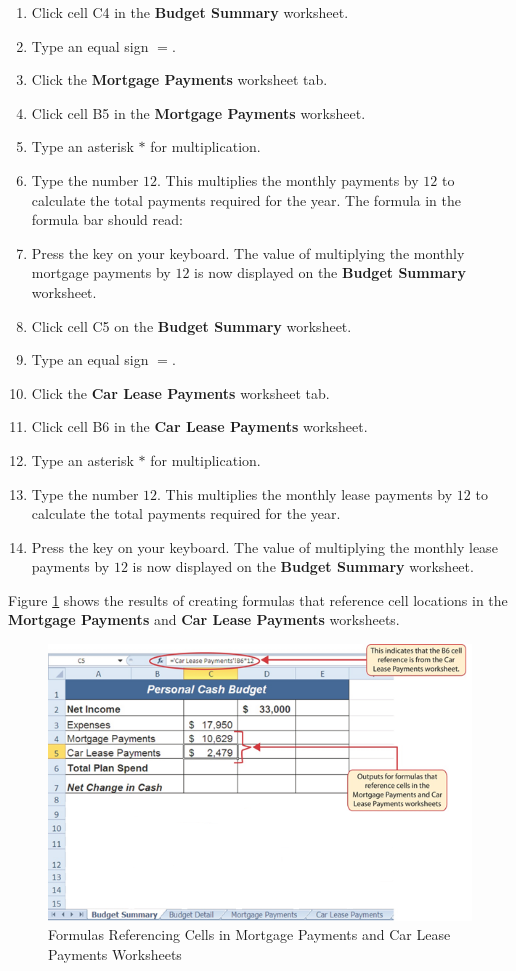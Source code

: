 \begin{enumerate}
	\item Click cell \textsf{C4} in the \textbf{Budget Summary} worksheet.
	\item Type an equal sign $ = $.
	\item Click the \textbf{Mortgage Payments} worksheet tab.
	\item Click cell \textsf{B5} in the \textbf{Mortgage Payments} worksheet.
	\item Type an asterisk $ * $ for multiplication.
	\item Type the number $ 12 $. This multiplies the monthly payments by $ 12 $ to calculate the total payments required for the year. The formula in the formula bar should read: 
	\item Press the  key on your keyboard. The value of multiplying the monthly mortgage payments by $ 12 $ is now displayed on the \textbf{Budget Summary} worksheet.
	\item Click cell \textsf{C5} on the \textbf{Budget Summary} worksheet.
	\item Type an equal sign $ = $.
	\item Click the \textbf{Car Lease Payments} worksheet tab.
	\item Click cell \textsf{B6} in the \textbf{Car Lease Payments} worksheet.
	\item Type an asterisk $ * $ for multiplication.
	\item Type the number $ 12 $. This multiplies the monthly lease payments by $ 12 $ to calculate the total payments required for the year.
	\item Press the  key on your keyboard. The value of multiplying the monthly lease payments by $ 12 $ is now displayed on the \textbf{Budget Summary} worksheet.
\end{enumerate}

Figure \ref{02:fig37} shows the results of creating formulas that reference cell locations in the \textbf{Mortgage Payments} and \textbf{Car Lease Payments} worksheets.

\begin{figure}[H]
	\centering
	\includegraphics[width=\maxwidth{.95\linewidth}]{gfx/ch02_fig37}
	\caption{Formulas Referencing Cells in Mortgage Payments and Car Lease Payments Worksheets}
	\label{02:fig37}
\end{figure}

